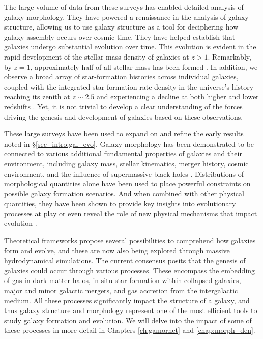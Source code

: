 The large volume of data from these surveys has enabled detailed analysis of galaxy morphology. They have powered a renaissance in the analysis of galaxy structure, allowing us to use galaxy structure as a tool for deciphering how galaxy assembly occurs over cosmic time. They have helped establish that galaxies undergo substantial evolution over time. This evolution is evident in the rapid development of the stellar mass density of galaxies at $z > 1$. Remarkably, by $z = 1$, approximately half of all stellar mass has been formed \citep[e.g.,][]{bundy_05,mortlock_11}. In addition, we observe a broad array of star-formation histories across individual galaxies, coupled with the integrated star-formation rate density in the universe's history reaching its zenith at $z \sim 2.5$ and experiencing a decline at both higher and lower redshifts \citep[e.g.,][]{shapely_11, madau_dickinson_14}. Yet, it is not trivial to develop  a clear understanding of the forces driving the genesis and development of galaxies based on these observations. 

These large surveys have been used to expand on and refine the early results noted in \S \ref{sec_intro:gal_evo}. Galaxy morphology has been demonstrated to be connected to various additional fundamental properties of galaxies and their environment, including galaxy mass, stellar kinematics, merger history, cosmic environment, and the influence of supermassive black holes \citep[e.g.,][]{Tremaine2002TheCorrelation, pozzetti_10, wuyts_11, Huertas-Company2016MassCANDELS,powell_17, hsc_morph_den, Dimauro2022CoincidenceGrowth}. Distributions of morphological quantities alone have been used to place powerful constraints on possible galaxy formation scenarios. And when combined with other physical quantities, they have been shown to provide key insights into evolutionary processes at play or even reveal the role of new physical  mechanisms that impact evolution \citep[e.g.,][]{Kauffmann2004TheGalaxies,Weinmann2006PropertiesMass,Schawinski2007TheGalaxies,vanderWel2008TheMass,Schawinski2014TheGalaxies}.

Theoretical frameworks propose several possibilities to comprehend how galaxies form and evolve, and these are now also being explored through massive hydrodynamical simulations. The current consensus posits that the genesis of galaxies could occur through various processes. These encompass the embedding of gas in dark-matter halos, in-situ star formation within collapsed galaxies, major and minor galactic mergers, and gas accretion from the intergalactic medium. All these processes significantly impact the structure of a galaxy, and thus galaxy structure and morphology represent one of the most efficient tools to study galaxy formation and evolution. We will delve into the impact of some of these processes in more detail in Chapters \ref{ch:gamornet} and \ref{chap:morph_den}. 

